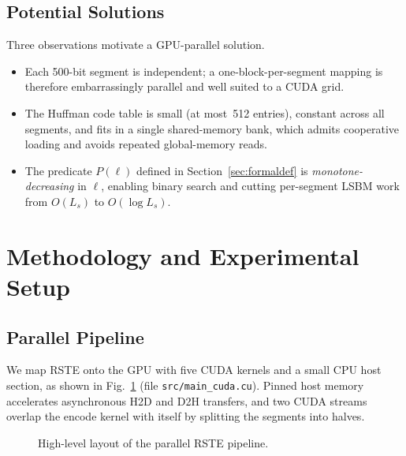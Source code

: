 \documentclass[runningheads]{llncs}
\begin{document}
\subsection{Potential Solutions}
\label{sec:solutions}

Three observations motivate a GPU-parallel solution.
\begin{itemize}
\item Each 500-bit segment is independent; a one-block-per-segment
   mapping is therefore embarrassingly parallel and well suited to a
   CUDA grid.
\item The Huffman code table is small (at most~512 entries), constant
   across all segments, and fits in a single shared-memory bank, which
   admits cooperative loading and avoids repeated global-memory reads.
\item The predicate $P(\ell)$ defined in Section~\ref{sec:formaldef}
   is \emph{monotone-decreasing} in $\ell$, enabling binary search
   and cutting per-segment LSBM work from $O(L_s)$ to $O(\log L_s)$.
\end{itemize}

\section{Methodology and Experimental Setup}
\label{sec:method}

\subsection{Parallel Pipeline}
We map RSTE onto the GPU with five CUDA kernels and a small CPU host
section, as shown in Fig.~\ref{fig:pipeline} (file
\texttt{src/main\_cuda.cu}).  Pinned host memory accelerates
asynchronous H2D and D2H transfers, and two CUDA streams overlap the
encode kernel with itself by splitting the segments into halves.

\begin{figure}[t]
\centering
{}
\caption{High-level layout of the parallel RSTE pipeline.}
\label{fig:pipeline}
\end{figure}
\end{document}

